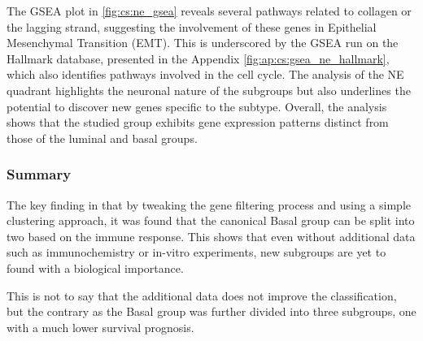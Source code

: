 The GSEA plot in \cref{fig:cs:ne_gsea} reveals several pathways related to collagen or the lagging strand, suggesting the involvement of these genes in Epithelial Mesenchymal Transition (EMT). This is underscored by the GSEA run on the Hallmark database, presented in the Appendix \cref{fig:ap:cs:gsea_ne_hallmark}, which also identifies pathways involved in the cell cycle. The analysis of the NE quadrant highlights the neuronal nature of the subgroups but also underlines the potential to discover new genes specific to the subtype. Overall, the analysis shows that the studied group exhibits gene expression patterns distinct from those of the luminal and basal groups.


\subsubsection{Summary}

The key finding in that by tweaking the gene filtering process and using a simple clustering approach, it was found that the canonical Basal group can be split into two based on the immune response. This shows that even without additional data such as immunochemistry or in-vitro experiments, new subgroups are yet to found with a biological importance.

This is not to say that the additional data does not improve the classification, but the contrary as the Basal group was further divided into three subgroups, one with a much lower survival prognosis. 



